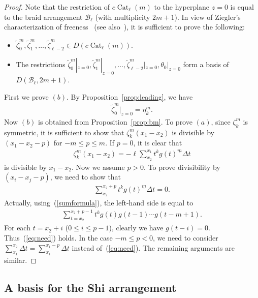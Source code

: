 \documentclass[pdftex]{sigma}
\numberwithin{equation}{section}
\newcommand{\B}{\mathcal{B}}
\newcommand{\Cat}{\operatorname{Cat}}
\newcommand{\sint}{\sum\nolimits}
\begin{document}
\begin{proof}
Note that the restriction of $c\Cat_\ell(m)$ to the hyperplane $z=0$ is
equal to the braid arrangement $\B_\ell$ (with multiplicity $2m+1$).
In view of Ziegler's characterization of freeness~\cite{zie} (see also~\cite[Corollary~1.35]{yos-survey}), it is sufficient to prove the
following:
\begin{itemize}\itemsep=0pt
\item[$(a)$]
$\widetilde{\zeta}_0^m, \widetilde{\zeta}_1^m, \dots,
\widetilde{\zeta}_{\ell-2}^m\in D(c\Cat_\ell(m))$.
\item[$(b)$]
The restrictions
$\widetilde{\zeta}_0^m|_{z=0}, \widetilde{\zeta}_1^m|_{z=0}, \dots,
\widetilde{\zeta}_{\ell-2}^m|_{z=0}, \theta_0|_{z=0}$
form a basis of $D(\B_\ell, 2m+1)$.
\end{itemize}
First we prove $(b)$. By Proposition~\ref{prop:leading}, we have
\begin{gather*}
\widetilde{\zeta}_0^m|_{z=0}=\eta_k^m.
\end{gather*}
Now $(b)$ is obtained from Proposition~\ref{prop:bm}.
To prove $(a)$, since $\zeta_k^m$ is symmetric, it is sufficient to show that
$\zeta_k^m(x_1-x_2)$ is divisible by $(x_1-x_2-p)$ for $-m\leq p\leq m$.
If $p=0$, it is clear that
\begin{gather*}
\zeta_k^m(x_1-x_2)=
-\ell\sint_{x_2}^{x_1}t^kg(t)^{\underline{m}} \Delta t
\end{gather*}
is divisible by $x_1-x_2$. Now we assume $p>0$. To prove divisibility
by $(x_i-x_j-p)$, we need to show that
\begin{gather}
\label{eq:need}
\sint_{x_2}^{x_2+p}t^kg(t)^{\underline{m}} \Delta t=0.
\end{gather}
Actually, using~(\ref{sumformula}), the left-hand side is equal to
\begin{gather*}
\sum_{t=x_2}^{x_2+p-1}t^kg(t)g(t-1)\cdots g(t-m+1).
\end{gather*}
For each $t=x_2+i$ ($0\leq i\leq p-1$), clearly we have $g(t-i)=0$.
Thus~(\ref{eq:need}) holds.
In the case $-m\leq p<0$, we need to consider
$\sint_{x_1}^{x_2}\Delta t=\sint_{x_1}^{x_1-p}\Delta t$ instead of~(\ref{eq:need}).
The remaining arguments are similar.
\end{proof}

\subsection{A basis for the Shi arrangement}
\end{document}

